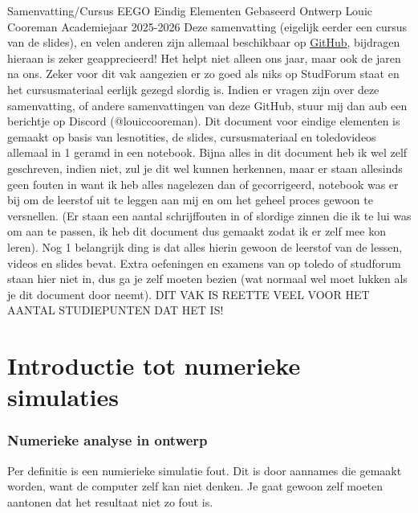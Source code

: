 \documentclass[a4paper,11pt,twoside]{report}
\begin{document}
\kuleuventitle
{Samenvatting/Cursus EEGO}
{Eindig Elementen Gebaseerd Ontwerp}
{Louic Cooreman}
{Academiejaar 2025-2026}
\newpage
Deze samenvatting (eigelijk eerder een cursus van de slides), en velen anderen zijn allemaal
beschikbaar op
\href{https://github.com/KUL-Industriele-ingenieurs/Samenvattingen-Ku-leuven-Industriele-ingenieurs}{GitHub},
bijdragen hieraan is zeker geapprecieerd! Het helpt niet alleen ons jaar, maar ook de jaren na ons.
Zeker voor dit vak aangezien er zo goed als niks op StudForum staat en het cursusmateriaal eerlijk
gezegd slordig is. Indien er vragen zijn over deze samenvatting, of andere samenvattingen van deze
GitHub, stuur mij dan aub een berichtje op Discord (@louiccooreman).
\newline
\newline
Dit document voor eindige elementen is gemaakt op basis van lesnotities, de slides, cursusmateriaal
en toledovideos allemaal in 1 geramd in een notebook. Bijna alles in dit document heb ik wel zelf
geschreven, indien niet, zul je dit wel kunnen herkennen, maar er staan allesinds geen fouten in
want ik heb alles nagelezen dan of gecorrigeerd, notebook was er bij om de leerstof uit te leggen
aan mij en om het geheel proces gewoon te versnellen. (Er staan een aantal schrijffouten in of
slordige zinnen die ik te lui was om aan te passen, ik heb dit document dus gemaakt zodat ik er zelf
mee kon leren). Nog 1 belangrijk ding is dat alles hierin gewoon de leerstof van de lessen, videos
en slides bevat. Extra oefeningen en examens van op toledo of studforum staan hier niet in, dus ga
je zelf moeten bezien (wat normaal wel moet lukken als je dit document door neemt). DIT VAK IS
REETTE VEEL VOOR HET AANTAL STUDIEPUNTEN DAT HET IS!
\newline
\tableofcontents
\newpage
\chapter{Introductie tot numerieke simulaties}
\subsection{Numerieke analyse in ontwerp}
\begin{conceptbox}
    Per definitie is een numierieke simulatie fout. Dit is door aannames die gemaakt worden, want de
    computer zelf kan niet denken. Je gaat gewoon zelf moeten aantonen dat het resultaat niet zo fout
    is.
\end{conceptbox}
\end{document}
